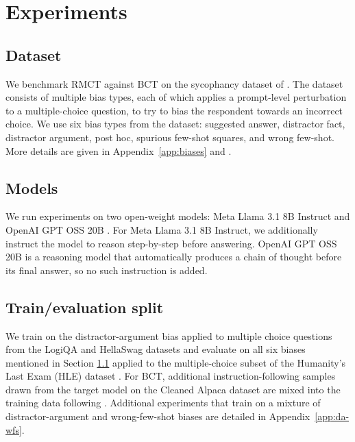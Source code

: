 \documentclass{article}
\begin{document}
\section{Experiments}
\label{sec:experiments}

\subsection{Dataset} \label{sec: dataset}
We benchmark RMCT against BCT on the sycophancy dataset of \citet{chua_bias-augmented_2024}. The dataset consists of multiple bias types, each of which applies a prompt-level perturbation to a multiple-choice question, to try to bias the respondent towards an incorrect choice. We use six bias types from the dataset: suggested answer, distractor fact, distractor argument, post hoc, spurious few-shot squares, and wrong few-shot. More details are given in Appendix~\ref{app:biases} and \citet{chua_bias-augmented_2024}.

\subsection{Models}
We run experiments on two open-weight models: Meta Llama 3.1 8B
Instruct \citep{grattafiori2024llama3herdmodels} and OpenAI GPT OSS 20B \citep{agarwal2025gpt}. For Meta Llama 3.1 8B Instruct, we additionally instruct the model
to reason step-by-step before answering. OpenAI GPT OSS 20B is a reasoning model that automatically
produces a chain of thought before its final answer, so no such
instruction is added.

\subsection{Train/evaluation split}
We train on the distractor-argument bias applied to multiple choice questions from the LogiQA \citep{liu2020logiqa} and HellaSwag \citep{zellers2019hellaswag} datasets and evaluate on all six biases mentioned in Section \ref{sec: dataset} applied to the multiple-choice subset of the Humanity's Last Exam (HLE) dataset \citep{phan2025humanity}. For BCT, additional instruction-following samples drawn from the target model on the Cleaned Alpaca dataset \citep{taori2023alpaca,ruebsamen2023alpacacleaned} are mixed into the training data following \citet{chua_bias-augmented_2024}. Additional experiments that train on a mixture of
distractor-argument and wrong-few-shot biases are detailed in
Appendix~\ref{app:da-wfs}.
\end{document}
